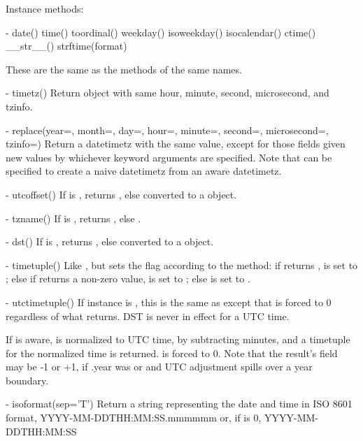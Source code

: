 Instance methods:

  - date()
    time()
    toordinal()
    weekday()
    isoweekday()
    isocalendar()
    ctime()
    __str__()
    strftime(format)

    These are the same as the  methods of the same names.

  - timetz()
    Return  object with same hour, minute, second, microsecond,
    and tzinfo.

  - replace(year=, month=, day=, hour=, minute=, second=, microsecond=,
            tzinfo=)
    Return a datetimetz with the same value, except for those fields given
    new values by whichever keyword arguments are specified.  Note that
     can be specified to create a naive datetimetz from
    an aware datetimetz.

  - utcoffset()
    If  is , returns , else
     converted to a 
    object.

  - tzname()
    If  is , returns , else
    .

  - dst()
    If  is , returns , else
     converted to a 
    object.

  - timetuple()
    Like , but sets the
     flag according to the  method:  if
     returns ,  is set to
    ; else if  returns a non-zero value,
     is set to ; else  is set
    to .

  - utctimetuple()
    If  instance  is \naive, this is the same as
     except that  is forced to 0
    regardless of what  returns.  DST is never in effect
    for a UTC time.

    If  is aware,  is normalized to UTC time, by subtracting
     minutes, and a timetuple for the
    normalized time is returned.   is forced to 0.
    Note that the result's  field may be
    -1 or +1, if .year was
     or  and UTC adjustment spills over a
    year boundary.

  - isoformat(sep='T')
    Return a string representing the date and time in ISO 8601 format,
        YYYY-MM-DDTHH:MM:SS.mmmmmm
    or, if  is 0,
        YYYY-MM-DDTHH:MM:SS

